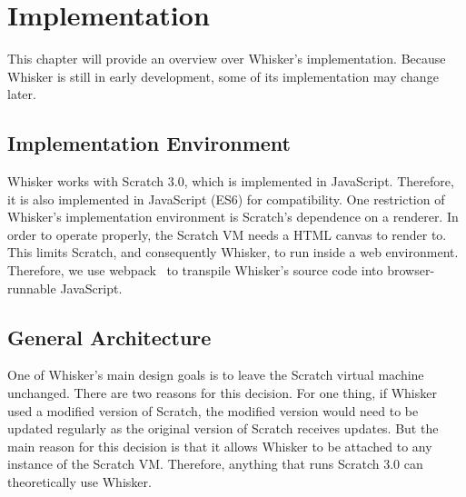 \chapter{Implementation}
\label{cha:implementation}

This chapter will provide an overview over Whisker's implementation.
Because Whisker is still in early development, some of its implementation may change later.

%
%

\section{Implementation Environment}
\label{sec:implementation_environment}

Whisker works with Scratch 3.0, which is implemented in JavaScript.
Therefore, it is also implemented in JavaScript (ES6) for compatibility.
One restriction of Whisker's implementation environment is Scratch's dependence on a renderer.
In order to operate properly, the Scratch VM needs a HTML canvas to render to.
This limits Scratch, and consequently Whisker, to run inside a web environment.
Therefore, we use webpack~\cite{webpack} to transpile Whisker's source code into browser-runnable JavaScript.

\section{General Architecture}
\label{sec:general_architecture}

One of Whisker's main design goals is to leave the Scratch virtual machine unchanged.
There are two reasons for this decision.
For one thing, if Whisker used a modified version of Scratch,
the modified version would need to be updated regularly as the original version of Scratch receives updates.
But the main reason for this decision is that it allows Whisker to be attached to any instance of the Scratch VM.
Therefore, anything that runs Scratch 3.0 can theoretically use Whisker.
\parspace

